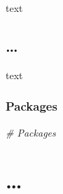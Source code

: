 \documentclass[
]{article}
\newenvironment{Shaded}{\begin{snugshade}}{\end{snugshade}}
\newcommand{\CommentTok}[1]{\textcolor[rgb]{0.56,0.35,0.01}{\textit{#1}}}
\begin{document}
text

\hypertarget{section-5}{%
\subsection{\ldots{}}\label{section-5}}

text

\hypertarget{prediction-packages}{%
\subsubsection{Packages}\label{prediction-packages}}

\begin{Shaded}
\begin{Highlighting}[]
\CommentTok{\# Packages}
\end{Highlighting}
\end{Shaded}

\hypertarget{appendix-appendix}{%
\appendix}


\hypertarget{section-6}{%
\section{\ldots{}}\label{section-6}}

  
\end{document}
